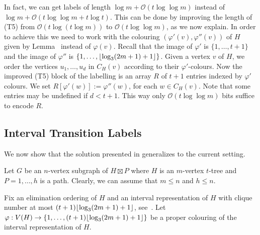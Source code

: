 \documentclass[kpfonts]{patmorin}
\newcommand{\Oh}{\mathcal{O}}
\let\leq\leqslant
\begin{document}
In fact, we can get labels of length $\log{m} + \Oh(t\log\log{m})$ instead of $\log{m} + \Oh(t\log\log{m}+ t\log t)$. 
This can be done by improving the length of (T5) from $\Oh ( t \log( t  \log m ))$ to $\Oh ( t  \log\log m )$, as we now explain.  
In order to achieve this we need to work with the colouring $(\varphi'(v),\varphi''(v))$ of $H$ given by Lemma~ instead of $\varphi(v)$. 
Recall that the image of $\varphi'$ is $\{1,\ldots,t+1\}$ and the image of $\varphi''$ is $\{1,\ldots,{\lfloor \log_3(2m+1)+1 \rfloor}\}$.
Given a vertex $v$ of $H$, we order the vertices $u_1, \dots, u_d$ in $C_H(v)$ according to their $\varphi'$-colours. 
Now the improved (T5) block of the labelling is an array $R$ of $t+1$ entries indexed by $\varphi'$ colours. 
We set $R[\varphi'(w)] := \varphi''(w)$, for each $w\in C_H(v)$. 
Note that some entries may be undefined if $d<t+1$. 
This way only $\Oh(t\log\log{m})$ bits suffice to encode $R$. 



\subsection{Interval Transition Labels}

We now show that the solution presented in  generalizes to the current setting.

Let $G$ be an $n$-vertex subgraph of $H\boxtimes P$ where $H$ is an $m$-vertex $t$-tree and $P=1,\dots,h$ is a path. Clearly, we can assume that $m\leq n$ and $h\leq n$.

Fix an elimination ordering of $H$ and an interval representation of $H$ with clique number at most $(t+1){\lfloor \log_3(2m+1)+1 \rfloor}$, see~.  Let $\varphi:V(H)\to\{1,\dots, (t+1){\lfloor \log_3(2m+1)+1 \rfloor} \}$ be a proper colouring of the interval representation of $H$.
\end{document}
